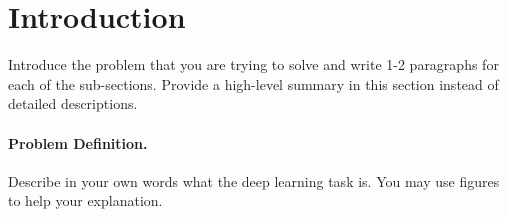 \documentclass{article}
\begin{document}



\section{Introduction}
\label{sec:intro}
Introduce the problem that you are trying to solve and write 1-2 paragraphs for each of the sub-sections.  Provide a high-level summary in this section instead of detailed descriptions.
\paragraph{Problem Definition.}
Describe in your own words what the deep learning task is.  You may use figures to help your explanation.
\end{document}
